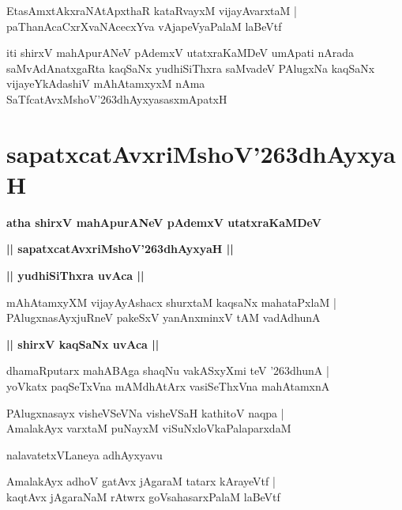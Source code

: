 \documentclass[twoside,12pt,openright]{book}
\def\S{\char'263}
\newcounter{shloka}[chapter]
\def\uvaca#1{\centerline{{\large\textbf{#1}}}}
\begin{document}
\begin{shloka}%
EtasAmxtAkxraNAtApxthaR kataRvayxM vijayAvarxtaM |\\
paThanAcaCxrXvaNAcecxYva vAjapeVyaPalaM laBeVtf
\end{shloka}

\begin{center}
iti shirxV mahApurANeV pAdemxV utatxraKaMDeV umApati nArada saMvAdAnatxgaRta kaqSaNx yudhiSiThxra 
saMvadeV PAlugxNa kaqSaNx vijayeYkAdashiV mAhAtamxyxM nAma SaTfcatAvxMshoV\S dhAyxyasasxmApatxH
\end{center}

\chapter{sapatxcatAvxriMshoV\S dhAyxyaH}

\begin{center}
{\LARGE\bfseries atha shirxV mahApurANeV pAdemxV utatxraKaMDeV}
\end{center}

\begin{center}
{\LARGE\bfseries || sapatxcatAvxriMshoV\S dhAyxyaH ||}
\end{center}

\uvaca{|| yudhiSiThxra uvAca ||}

\begin{shloka}%
mAhAtamxyXM vijayAyAshacx shurxtaM kaqsaNx mahataPxlaM |\\
PAlugxnasAyxjuRneV pakeSxV yanAnxminxV tAM vadAdhunA 
\end{shloka}

\uvaca{|| shirxV kaqSaNx uvAca ||}

\begin{shloka}%
dhamaRputarx mahABAga shaqNu vakASxyXmi teV \S dhunA |\\
yoVkatx paqSeTxVna mAMdhAtArx vasiSeThxVna mahAtamxnA
\end{shloka}

\begin{shloka}%
PAlugxnasayx visheVSeVNa visheVSaH kathitoV naqpa |\\
AmalakAyx varxtaM puNayxM viSuNxloVkaPalaparxdaM 
\end{shloka}

\begin{center}
nalavatetxVLaneya adhAyxyavu
\end{center}

\begin{shloka}%
AmalakAyx adhoV gatAvx jAgaraM tatarx kArayeVtf |\\
kaqtAvx jAgaraNaM rAtwrx goVsahasarxPalaM laBeVtf
\end{shloka}
\end{document}
